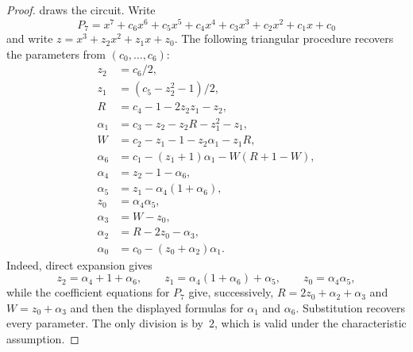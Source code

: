 \begin{proof}
 draws the circuit.
Write
\[
  P_7=x^7+c_6x^6+c_5x^5+c_4x^4+c_3x^3+c_2x^2+c_1x+c_0
\]
and write $z=x^3+z_2x^2+z_1x+z_0$.  The following triangular procedure
recovers the parameters from $(c_0,\ldots,c_6)$:
\begin{align}
 z_2&=c_6/2,\\
 z_1&=(c_5-z_2^2-1)/2,\\
 R&=c_4-1-2z_2z_1-z_2,\\
 \alpha_1&=c_3-z_2-z_2R-z_1^2-z_1,\\
 W&=c_2-z_1-1-z_2\alpha_1-z_1R,\\
 \alpha_6&=c_1-(z_1+1)\alpha_1-W(R+1-W),\\
 \alpha_4&=z_2-1-\alpha_6,\\
 \alpha_5&=z_1-\alpha_4(1+\alpha_6),\\
 z_0&=\alpha_4\alpha_5,\\
 \alpha_3&=W-z_0,\\
 \alpha_2&=R-2z_0-\alpha_3,\\
 \alpha_0&=c_0-(z_0+\alpha_2)\alpha_1.
\end{align}
Indeed, direct expansion gives
\[
 z_2=\alpha_4+1+\alpha_6,\qquad
 z_1=\alpha_4(1+\alpha_6)+\alpha_5,\qquad
 z_0=\alpha_4\alpha_5,
\]
while the coefficient equations for $P_7$ give, successively,
$R=2z_0+\alpha_2+\alpha_3$ and $W=z_0+\alpha_3$ and then the displayed
formulas for $\alpha_1$ and $\alpha_6$.
Substitution recovers every parameter.  The only division is by~$2$, which
is valid under the characteristic assumption.
\end{proof}


